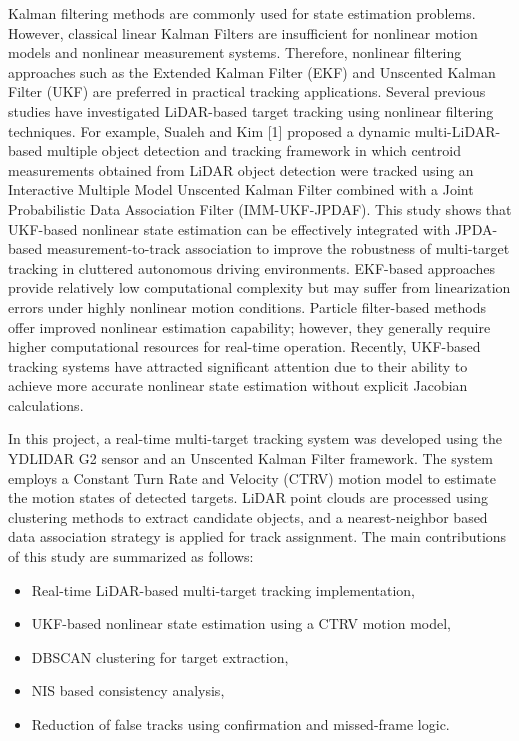 \documentclass[conference]{IEEEtran}
\begin{document}
Kalman filtering methods are commonly used for state estimation problems. However, classical linear Kalman Filters are insufficient for nonlinear motion models and nonlinear measurement systems. Therefore, nonlinear filtering approaches such as the Extended Kalman Filter (EKF) and Unscented Kalman Filter (UKF) are preferred in practical tracking applications. Several previous studies have investigated LiDAR-based target tracking using nonlinear filtering techniques. For example, Sualeh and Kim [1] proposed a dynamic multi-LiDAR-based multiple object detection and tracking framework in which centroid measurements obtained from LiDAR object detection were tracked using an Interactive Multiple Model Unscented Kalman Filter combined with a Joint Probabilistic Data Association Filter (IMM-UKF-JPDAF). This study shows that UKF-based nonlinear state estimation can be effectively integrated with JPDA-based measurement-to-track association to improve the robustness of multi-target tracking in cluttered autonomous driving environments. EKF-based approaches provide relatively low computational complexity but may suffer from linearization errors under highly nonlinear motion conditions. Particle filter-based methods offer improved nonlinear estimation capability; however, they generally require higher computational resources for real-time operation. Recently, UKF-based tracking systems have attracted significant attention due to their ability to achieve more accurate nonlinear state estimation without explicit Jacobian calculations.

In this project, a real-time multi-target tracking system was developed using the YDLIDAR G2 sensor and an Unscented Kalman Filter framework. The system employs a Constant Turn Rate and Velocity (CTRV) motion model to estimate the motion states of detected targets. LiDAR point clouds are processed using clustering methods to extract candidate objects, and a nearest-neighbor based data association strategy is applied for track assignment. The main contributions of this study are summarized as follows:
\begin{itemize}
    \item Real-time LiDAR-based multi-target tracking implementation,
    \item UKF-based nonlinear state estimation using a CTRV motion model,
    \item DBSCAN clustering for target extraction,
    \item NIS based consistency analysis,
    \item Reduction of false tracks using confirmation and missed-frame logic.
\end{itemize}
\end{document}

